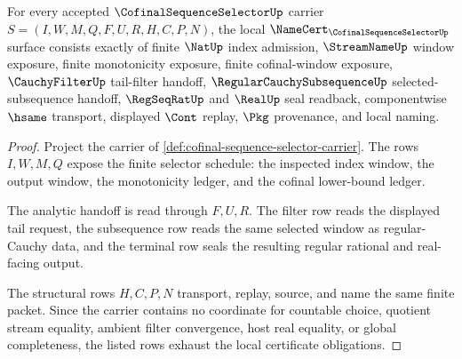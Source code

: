 \begin{theorem}
\label{thm:cofinal-sequence-selector-namecert-obligations}
For every accepted $\CofinalSequenceSelectorUp$ carrier $S=(I,W,M,Q,F,U,R,H,C,P,N)$, the local $\NameCert_{\CofinalSequenceSelectorUp}$ surface consists exactly of finite $\NatUp$ index admission, $\StreamNameUp$ window exposure, finite monotonicity exposure, finite cofinal-window exposure, $\CauchyFilterUp$ tail-filter handoff, $\RegularCauchySubsequenceUp$ selected-subsequence handoff, $\RegSeqRatUp$ and $\RealUp$ seal readback, componentwise $\hsame$ transport, displayed $\Cont$ replay, $\Pkg$ provenance, and local naming.
\end{theorem}
\begin{proof}
Project the carrier of \autoref{def:cofinal-sequence-selector-carrier}. The rows $I,W,M,Q$ expose the finite selector schedule: the inspected index window, the output window, the monotonicity ledger, and the cofinal lower-bound ledger.

The analytic handoff is read through $F,U,R$. The filter row reads the displayed tail request, the subsequence row reads the same selected window as regular-Cauchy data, and the terminal row seals the resulting regular rational and real-facing output.

The structural rows $H,C,P,N$ transport, replay, source, and name the same finite packet. Since the carrier contains no coordinate for countable choice, quotient stream equality, ambient filter convergence, host real equality, or global completeness, the listed rows exhaust the local certificate obligations.
\end{proof}

